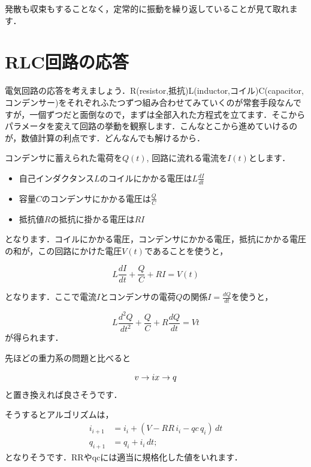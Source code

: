 \documentclass[11pt,dvipdfmx]{jsarticle}
\providecommand{\tightlist}{%
      \setlength{\itemsep}{0pt}\setlength{\parskip}{0pt}}
\begin{document}
発散も収束もすることなく，定常的に振動を繰り返していることが見て取れます．

    \section{RLC回路の応答}\label{rlcux56deux8defux306eux5fdcux7b54}

電気回路の応答を考えましょう．R(resistor,抵抗)L(inductor,コイル)C(capacitor,コンデンサー)をそれぞれふたつずつ組み合わせてみていくのが常套手段なんですが，一個ずつだと面倒なので，まずは全部入れた方程式を立てます．そこからパラメータを変えて回路の挙動を観察します．こんなとこから進めていけるのが，数値計算の利点です．どんなんでも解けるから．

コンデンサに蓄えられた電荷を\(Q(t)\),
回路に流れる電流を\(I(t)\)とします．

\begin{itemize}
\tightlist
\item
  自己インダクタンス\(L\)のコイルにかかる電圧は\(L \frac{dI}{dt}\)
\item
  容量\(C\)のコンデンサにかかる電圧は\(\frac{Q}{C}\)
\item
  抵抗値\(R\)の抵抗に掛かる電圧は\(RI\)
\end{itemize}

となります．コイルにかかる電圧，コンデンサにかかる電圧，抵抗にかかる電圧の和が，この回路にかけた電圧\(V(t)\)であることを使うと，

\[
L \frac{dI}{dt} + \frac{Q}{C} + RI = V(t)
\]

となります．ここで電流\(I\)とコンデンサの電荷\(Q\)の関係\(I=\frac{dQ}{dt}\)を使うと，

\[
L \frac{d^2Q}{dt^2} + \frac{Q}{C} + R\frac{dQ}{dt} = V{t}
\] が得られます．

先ほどの重力系の問題と比べると

\[
v \rightarrow i \\
x \rightarrow q
\] と置き換えれば良さそうです．

そうするとアルゴリズムは， \[
\begin{aligned}
i_{i+1} & = i_i + (V - RR \, i_i -qc \, q_i) \, dt \\
q_{i+1} & = q_i + i_i \, dt;
\end{aligned}
\] となりそうです．RRやqcには適当に規格化した値をいれます．
\end{document}
